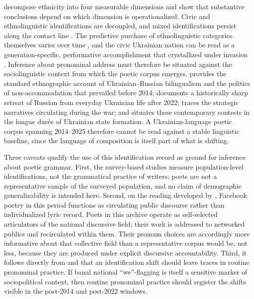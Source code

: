 \documentclass[12pt]{interact}
\theoremstyle{plain}%
\theoremstyle{definition}
\theoremstyle{remark}
\begin{document}
\citet{onuch2018capturing} decompose ethnicity into four measurable dimensions and show that substantive conclusions depend on which dimension is operationalized. Civic and
ethnolinguistic identifications are decoupled, and mixed identifications persist along the contact line \citep{popeleches2018identity, sasse2018war}. The predictive purchase of ethnolinguistic categories themselves varies over time \citep{kulyk2022imperfect}, and the civic Ukrainian nation can be read as
a generation-specific, performative accomplishment that crystallized under invasion \citep{onuch2022the}. Inference about pronominal address must therefore be situated against the sociolinguistic context from which the poetic corpus emerges. \citet{bilaniuk2005contested, bilaniuk2010language} provides the standard ethnographic account of Ukrainian--Russian bilingualism
and the politics of non-accommodation that prevailed before 2014; \citet{kulyk2024language} documents a historically sharp retreat of Russian from everyday Ukrainian life after 2022; \citet{popova2024russia} traces the strategic narratives circulating during the war; and \citet{plokhy2021the} situates these contemporary contests in the longue durée of Ukrainian state formation. A Ukrainian-language poetic corpus spanning 2014--2025 therefore cannot be read against a stable linguistic baseline, since the language of composition is itself part of what is shifting.

Three caveats qualify the use of this identification record as ground for inference about poetic grammar. First, the survey-based studies \citep{kulyk2016national, onuch2018capturing, kulyk2022imperfect} measure population-level identifications, not the grammatical practice of writers;
poets are not a representative sample of the surveyed population, and no claim of demographic generalizability is intended here. Second, on the reading developed by \citet{glaser2024poetry}, Facebook poetry in this period functions as circulating public discourse rather than individualized lyric
record. Poets in this archive operate as self-selected articulators of the national discursive field; their work is addressed to networked publics and recirculated within them. Their pronoun choices are accordingly more informative about that collective field than a representative corpus would be, not less, because they are produced under explicit discursive accountability. Third, it follows directly from \citet{billig1995banal} and \citet{petersoo2007what} that an identification shift should leave traces in routine pronominal practice. If banal national ``we''-flagging is itself a sensitive marker of sociopolitical context, then routine pronominal practice should register the shifts visible in the post-2014 and post-2022 windows.
\end{document}
